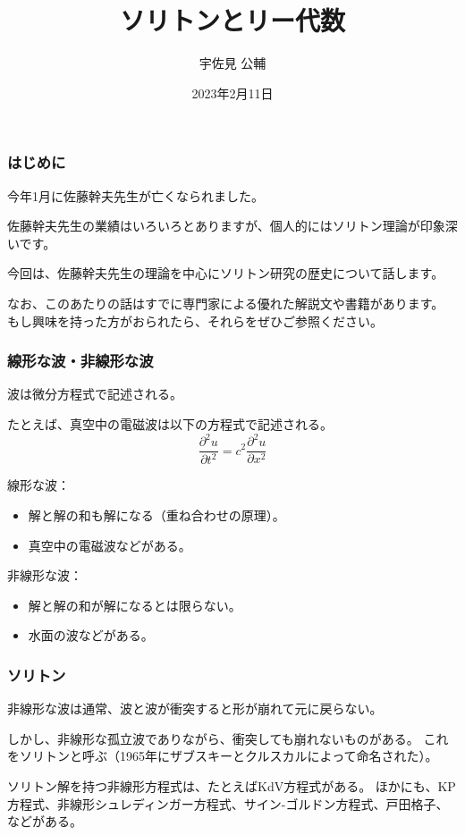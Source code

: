 \documentclass{beamer}
\title{ソリトンとリー代数}
\author{宇佐見 公輔}
\date{2023年2月11日}
\begin{document}
\maketitle

\begin{frame}
    \frametitle{はじめに}

    今年1月に佐藤幹夫先生が亡くなられました。

    \bigskip
    佐藤幹夫先生の業績はいろいろとありますが、個人的にはソリトン理論が印象深いです。

    \bigskip
    今回は、佐藤幹夫先生の理論を中心にソリトン研究の歴史について話します。

    \bigskip
    なお、このあたりの話はすでに専門家による優れた解説文や書籍があります。
    もし興味を持った方がおられたら、それらをぜひご参照ください。
\end{frame}

\begin{frame}
    \frametitle{線形な波・非線形な波}

    波は微分方程式で記述される。

    たとえば、真空中の電磁波は以下の方程式で記述される。
    \begin{equation}
        \frac{∂^2u}{∂t^2}=c^2\frac{∂^2u}{∂x^2}
    \end{equation}

    \bigskip
    線形な波：
    \begin{itemize}
        \item 解と解の和も解になる（重ね合わせの原理）。
        \item 真空中の電磁波などがある。
    \end{itemize}

    \bigskip
    非線形な波：
    \begin{itemize}
        \item 解と解の和が解になるとは限らない。
        \item 水面の波などがある。
    \end{itemize}
\end{frame}

\begin{frame}
    \frametitle{ソリトン}

    非線形な波は通常、波と波が衝突すると形が崩れて元に戻らない。

    \bigskip
    しかし、非線形な孤立波でありながら、衝突しても崩れないものがある。
    これをソリトンと呼ぶ（1965年にザブスキーとクルスカルによって命名された）。

    \bigskip
    ソリトン解を持つ非線形方程式は、たとえばKdV方程式がある。
    ほかにも、KP方程式、非線形シュレディンガー方程式、サイン-ゴルドン方程式、戸田格子、などがある。
\end{frame}
\end{document}
